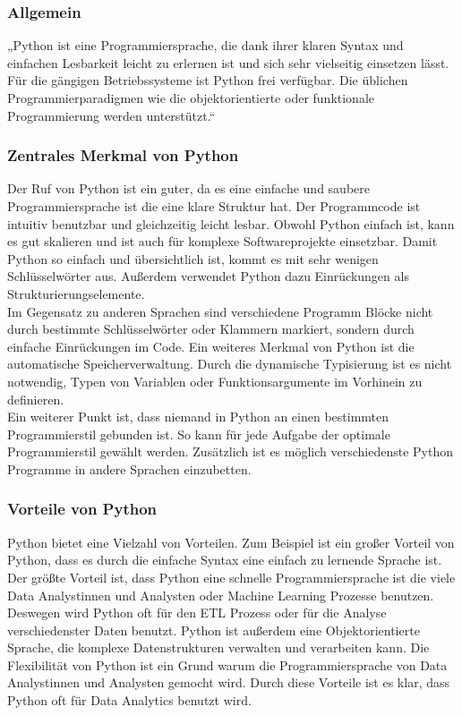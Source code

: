 \subsubsection{Allgemein}
„Python ist eine Programmiersprache, die dank ihrer klaren Syntax und einfachen Lesbarkeit leicht zu erlernen ist und sich sehr vielseitig einsetzen lässt. Für die gängigen Betriebssysteme ist Python frei verfügbar. Die üblichen Programmierparadigmen wie die objektorientierte oder funktionale Programmierung werden unterstützt.“~\cite{bigdata_python_2020}
\subsubsection{Zentrales Merkmal von Python}
Der Ruf von Python ist ein guter, da es eine einfache und saubere Programmiersprache ist die eine klare Struktur hat. Der Programmcode ist intuitiv benutzbar und gleichzeitig leicht lesbar. Obwohl Python einfach ist, kann es gut skalieren und ist auch für komplexe Softwareprojekte einsetzbar. Damit Python so einfach und übersichtlich ist, kommt es mit sehr wenigen Schlüsselwörter aus. Außerdem verwendet Python dazu Einrückungen als Strukturierungselemente.\\

Im Gegensatz zu anderen Sprachen sind verschiedene Programm Blöcke nicht durch bestimmte Schlüsselwörter oder Klammern markiert, sondern durch einfache Einrückungen im Code. Ein weiteres Merkmal von Python ist die automatische Speicherverwaltung. Durch die dynamische Typisierung ist es nicht notwendig, Typen von Variablen oder Funktionsargumente im Vorhinein zu definieren.\\

Ein weiterer Punkt ist, dass niemand in Python an einen bestimmten Programmierstil gebunden ist. So kann für jede Aufgabe der optimale Programmierstil gewählt werden. Zusätzlich ist es möglich verschiedenste Python Programme in andere Sprachen einzubetten.
\subsubsection{Vorteile von Python}
Python bietet eine Vielzahl von Vorteilen. Zum Beispiel ist ein großer Vorteil von Python, dass es durch die einfache Syntax eine einfach zu lernende Sprache ist. Der größte Vorteil ist, dass Python eine schnelle Programmiersprache ist die viele Data Analystinnen und Analysten oder Machine Learning Prozesse benutzen. Deswegen wird Python oft für den ETL Prozess oder für die Analyse verschiedenster Daten benutzt. Python ist außerdem eine Objektorientierte Sprache, die komplexe Datenstrukturen verwalten und verarbeiten kann. Die Flexibilität von Python ist ein Grund warum die Programmiersprache von Data Analystinnen und Analysten gemocht wird. Durch diese Vorteile ist es klar, dass Python oft für Data Analytics benutzt wird.
